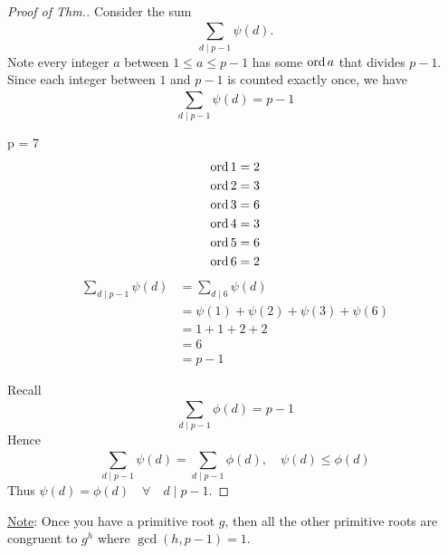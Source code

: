 \begin{theorem}
\begin{proof} [Proof of Thm.]
            Consider the sum
            \[ \sum_{d\mid p-1}^{}\psi(d). \]
            Note every integer $a$ between $1\le a\le p-1$ has some $\operatorname{ord}{a}$ 
            that divides $p-1$.
            Since each integer between $1$ and $p-1$ is counted exactly once,
            we have 
            \[ \sum_{d\mid p-1}^{} \psi(d) = p-1 \]
            \begin{mdframed}
            \begin{example}
                p = 7 
                \begin{align*}
                    \operatorname{ord}{1} &= 2 \\
                    \operatorname{ord}{2} &= 3 \\
                    \operatorname{ord}{3} &= 6 \\
                    \operatorname{ord}{4} &= 3 \\
                    \operatorname{ord}{5} &= 6 \\
                    \operatorname{ord}{6} &= 2
                \end{align*}
                \begin{align*}
                    \sum_{d\mid p-1}^{}\psi(d) &= \sum_{d\mid 6}^{} \psi(d) \\
                    &= \psi(1)+\psi(2)+\psi(3)+\psi(6) \\
                    &= 1+1+2+2 \\
                    &= 6 \\
                    &= p-1
                \end{align*}
            \end{example}
            \end{mdframed}

            Recall 
            \[ \sum_{d\mid p-1}^{}\phi(d) = p-1 \]
            Hence
            \[ \sum_{d\mid p-1}^{}\psi(d) = \sum_{d\mid p-1}^{}\phi(d), \quad\psi(d)\le \phi(d) \]  
            Thus $\psi(d) = \phi(d) \quad\forall\quad d\mid p-1$.
        \end{proof}
    \end{theorem}

    \underline{Note}: Once you have a primitive root $g$, then all the other primitive roots
    are congruent to $g^h$ where $\gcd(h,p-1) = 1$.

